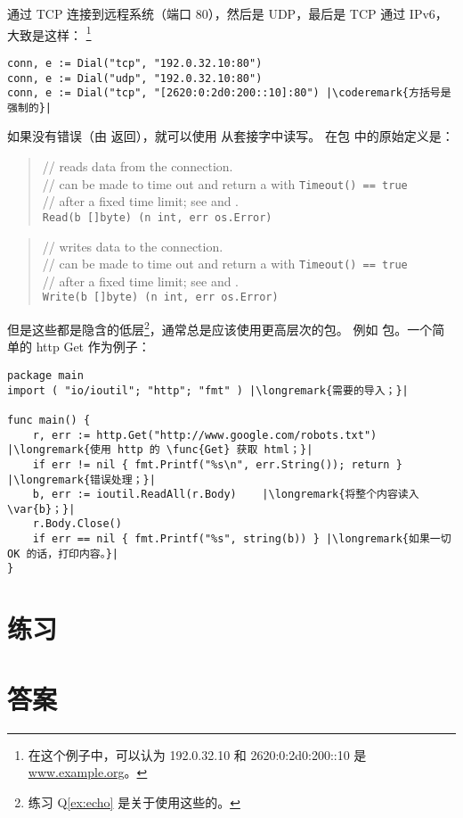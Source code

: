 通过 TCP 连接到远程系统（端口 80），然后是 UDP，最后是 TCP 通过 IPv6，大致是这样：
\footnote{在这个例子中，可以认为 192.0.32.10 和 2620:0:2d0:200::10 是 \url{www.example.org}。}
\begin{lstlisting}
conn, e := Dial("tcp", "192.0.32.10:80")
conn, e := Dial("udp", "192.0.32.10:80")
conn, e := Dial("tcp", "[2620:0:2d0:200::10]:80") |\coderemark{方括号是强制的}|
\end{lstlisting}

如果没有错误（由  返回），就可以使用  从套接字中读写。
在包  中的原始定义是：
\begin{quote}
//  reads data from the connection.\\
//  can be made to time out and return a  with \lstinline{Timeout() == true}\\
// after a fixed time limit; see  and .\\
\lstinline{Read(b []byte) (n int, err os.Error)}
\end{quote}

\begin{quote}
//  writes data to the connection.\\
//  can be made to time out and return a  with \lstinline{Timeout() == true}\\
// after a fixed time limit; see  and .\\
\lstinline{Write(b []byte) (n int, err os.Error)}
\end{quote}

但是这些都是隐含的低层\footnote{练习 Q\ref{ex:echo} 是关于使用这些的。}，通常总是应该使用更高层次的包。
例如  包。一个简单的 http Get 作为例子：
\begin{lstlisting}
package main
import ( "io/ioutil"; "http"; "fmt" ) |\longremark{需要的导入；}|

func main() {
    r, err := http.Get("http://www.google.com/robots.txt") |\longremark{使用 http 的 \func{Get} 获取 html；}|
    if err != nil { fmt.Printf("%s\n", err.String()); return } |\longremark{错误处理；}|
    b, err := ioutil.ReadAll(r.Body)    |\longremark{将整个内容读入 \var{b}；}|
    r.Body.Close()  
    if err == nil { fmt.Printf("%s", string(b)) } |\longremark{如果一切 OK 的话，打印内容。}|
}
\end{lstlisting}
\showremarks

\section{练习}














\cleardoublepage
\section{答案}
\shipoutAnswer
